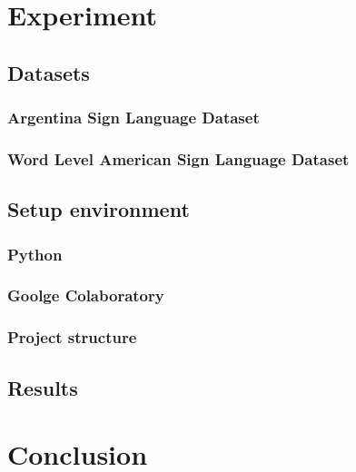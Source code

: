 \documentclass[a4paper, 12pt]{article}
\begin{document}
\section{Experiment}
\subsection{Datasets}
\subsubsection{Argentina Sign Language Dataset}
\subsubsection{Word Level American Sign Language Dataset}
\subsection{Setup environment}
\subsubsection{Python}
\subsubsection{Goolge Colaboratory}
\subsubsection{Project structure}
\subsection{Results}

\section{Conclusion}


\newpage

\newpage


\end{document}
